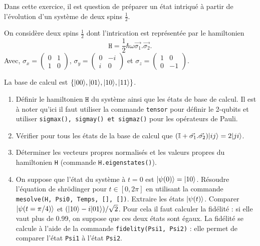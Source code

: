 Dans cette exercice, il est question de préparer un état intriqué à partir de l'évolution d'un système de deux spins $\frac{1}{2}$.

On considère deux spins $\frac{1}{2}$ dont l'intrication est représentée par le hamiltonien
\begin{equation}
\mathtt{H} = \dfrac{1}{2}\hbar\omega\vec{\sigma_1}.\vec{\sigma_2}.
\end{equation}
Avec, $\sigma_x = \begin{pmatrix}0 & 1 \\ 1 & 0 \end{pmatrix}$, $\sigma_y = \begin{pmatrix}0 & -i \\ i & 0 \end{pmatrix}$ et
$\sigma_z = \begin{pmatrix}1 & 0 \\ 0 & -1 \end{pmatrix}$.

La base de calcul est $\{\vert00\rangle,\vert01\rangle,\vert10\rangle,\vert11\rangle\}$.
\begin{enumerate}
\item Définir le hamiltonien $\mathtt{H}$ du système ainsi que les états de base de calcul. Il est à noter qu'ici il faut utiliser la commande \texttt{tensor} pour définir le 2-qubits et utiliser \texttt{sigmax(), sigmay() et sigmaz()} pour les opérateurs de Pauli.

\item Vérifier pour tous les états de la base de calcul que $(\mathbb{I}+\vec{\sigma_1}.\vec{\sigma_2})\vert ij\rangle=2\vert ji\rangle$.

\item Déterminer les vecteurs propres normalisés et les valeurs propres du hamiltonien \texttt{H} (commande \texttt{H.eigenstates()}).

\item On suppose que l'état du système à $t=0$ est $\vert\psi(0)\rangle=\vert10\rangle$. Résoudre l'équation de shr\"odinger pour $t\in[0,2\pi]$ en utilisant la commande \texttt{mesolve(H, Psi0, Temps, [], [])}. Extraire les états $\vert\psi(t)\rangle$. Comparer $\vert\psi(t=\pi/4)\rangle$ et $(\vert10\rangle-i\vert01\rangle)/\sqrt{2}$. Pour cela il faut calculer la fidélité : si elle vaut plus de 0.99, on suppose que ces deux états sont égaux. La fidélité se calcule à l'aide de la commande \texttt{fidelity(Psi1, Psi2)} : elle permet de comparer l'état \texttt{Psi1} à l'état \texttt{Psi2}.
\end{enumerate}
